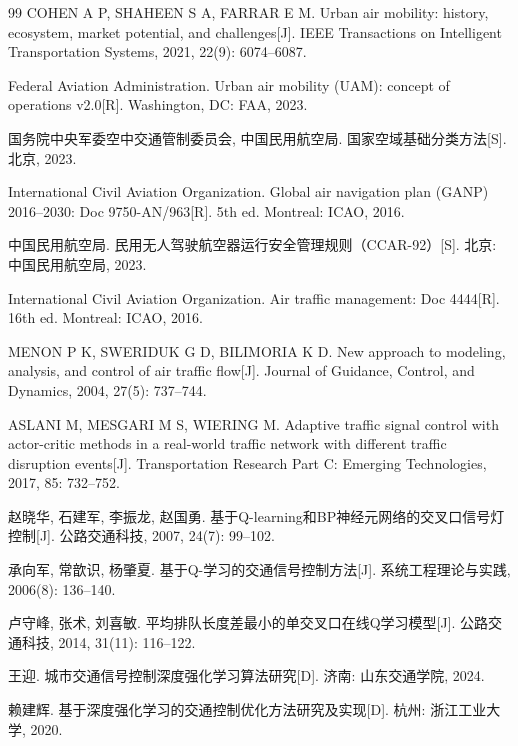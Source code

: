 \documentclass[12pt,a4paper,UTF8]{ctexart}
\begin{document}
\begin{thebibliography}{99}
 COHEN A P, SHAHEEN S A, FARRAR E M. Urban air mobility: history, ecosystem, market potential, and challenges[J]. IEEE Transactions on Intelligent Transportation Systems, 2021, 22(9): 6074--6087.

 Federal Aviation Administration. Urban air mobility (UAM): concept of operations v2.0[R]. Washington, DC: FAA, 2023.

 国务院中央军委空中交通管制委员会, 中国民用航空局. 国家空域基础分类方法[S]. 北京, 2023.

 International Civil Aviation Organization. Global air navigation plan (GANP) 2016--2030: Doc 9750-AN/963[R]. 5th ed. Montreal: ICAO, 2016.

 中国民用航空局. 民用无人驾驶航空器运行安全管理规则（CCAR-92）[S]. 北京: 中国民用航空局, 2023.

 International Civil Aviation Organization. Air traffic management: Doc 4444[R]. 16th ed. Montreal: ICAO, 2016.

 MENON P K, SWERIDUK G D, BILIMORIA K D. New approach to modeling, analysis, and control of air traffic flow[J]. Journal of Guidance, Control, and Dynamics, 2004, 27(5): 737--744.

 ASLANI M, MESGARI M S, WIERING M. Adaptive traffic signal control with actor-critic methods in a real-world traffic network with different traffic disruption events[J]. Transportation Research Part C: Emerging Technologies, 2017, 85: 732--752.

 赵晓华, 石建军, 李振龙, 赵国勇. 基于Q-learning和BP神经元网络的交叉口信号灯控制[J]. 公路交通科技, 2007, 24(7): 99--102.

 承向军, 常歆识, 杨肇夏. 基于Q-学习的交通信号控制方法[J]. 系统工程理论与实践, 2006(8): 136--140.

 卢守峰, 张术, 刘喜敏. 平均排队长度差最小的单交叉口在线Q学习模型[J]. 公路交通科技, 2014, 31(11): 116--122.

 王迎. 城市交通信号控制深度强化学习算法研究[D]. 济南: 山东交通学院, 2024.

 赖建辉. 基于深度强化学习的交通控制优化方法研究及实现[D]. 杭州: 浙江工业大学, 2020.


\end{thebibliography}
\end{document}
